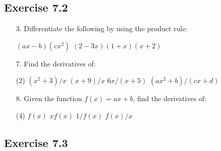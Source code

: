 \documentclass{./../../Latex/homework}
\begin{document}
\subsection*{Exercise 7.2}

\begin{enumerate}

\item[3.] Differentiate the following by using the product rule:
\begin{tasks}
\task[(d)]$(a x-b)\left(c x^{2}\right)$
\task[(e)]	$(2-3 x)(1+x)(x+2)$
\end{tasks}

\item[7.] Find the derivatives of:
\begin{tasks}(2)
\task  $\left(x^{2}+3\right) / x$
\task  $(x+9) / x$
\task  $6 x /(x+5)$
\task  $\left(a x^{2}+b\right) /(c x+d)$
\end{tasks}

\item[8.] Given the function $f(x)=a x+b$, find the derivatives of:
\begin{tasks}(4)
\task $f(x)$
\task $x f(x)$
\task $1 / f(x)$
\task $f(x) / x$
\end{tasks}

\end{enumerate}


\subsection*{Exercise 7.3}
\end{document}
